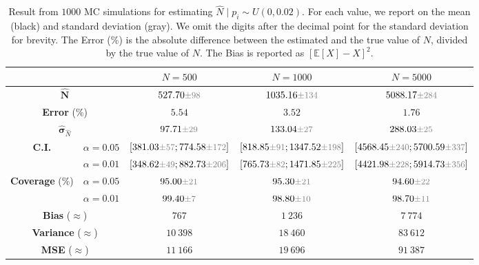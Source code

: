 \documentclass{article}
\newcommand{\variance}[1]{\ensuremath{\text{\small \textcolor{gray}{$\pm #1$}}}}
\begin{document}
\begin{table}[t]
    \centering 
    \caption*{$p_i \sim U(0, 0.02)$}
    \begin{tabular}{c c|c c c}
        \toprule
        & & \multicolumn{1}{|c|}{${N}=500$} & \multicolumn{1}{c|}{${N}=1000$} & \multicolumn{1}{c}{${N}=5000$} \\
        \midrule
        \multicolumn{2}{c|}{${\hat{\mathbf{N}}}$} & $527.70 \variance{98}$ & $1035.16 \variance{134}$ & $5088.17 \variance{284}$  \\
        \multicolumn{2}{c|}{\textbf{Error} (\%)} & $5.54$ & $3.52$ & $1.76$ \\
        \multicolumn{2}{c|}{${\hat{\mathbf{\sigma}}}_{\hat{N}}$} & $97.71 \variance{29}$ & $133.04 \variance{27}$ & $288.03 \variance{25}$\\
        \multirow{2}{*}{\textbf{C.I.}} & $\alpha = 0.05$ & $[381.03 \variance{57}; 774.58 \variance{172}]$ & $[818.85 \variance{91}; 1347.52 \variance{198}]$ & $[4568.45 \variance{240}; 5700.59 \variance{337}]$
        \\
        & $\alpha = 0.01$ & $[348.62 \variance{49}; 882.73 \variance{206}]$ & $[765.73 \variance{82}; 1471.85 \variance{225}]$ & $[4421.98 \variance{228}; 5914.73 \variance{356}]$ \\
        \midrule
        \multirow{2}{*}{\textbf{Coverage} (\%)} & $\alpha = 0.05$ & $95.00 \variance{21}$ & $95.30 \variance{21}$ & $94.60 \variance{22}$ \\
        & $\alpha = 0.01$ & $99.40 \variance{7}$ & $98.80 \variance{10}$ & $98.70 \variance{11}$ \\
        \multicolumn{2}{c|}{\textbf{Bias} ($\approx$)} & $767$ & $1\ 236$ & $7\ 774$ \\
        \multicolumn{2}{c|}{\textbf{Variance} ($\approx$)} & $10\ 398$ & $18\ 460$ & $83\ 612$ \\
        \multicolumn{2}{c|}{\textbf{MSE} ($\approx$)} & $11\ 166$ & $19\ 696$ & $91\ 387$ \\
        \bottomrule
    \end{tabular}
    \caption{Result from $1000$ MC simulations for estimating $\hat{N} \mid p_i \sim U(0, 0.02)$. For each value, we report on the mean (black) and standard deviation (gray). We omit the digits after the decimal point for the standard deviation for brevity.
    The Error (\%) is the absolute difference between the estimated and the true value of $N$, divided by the true value of $N$. The Bias is reported as ${\left[ \mathbb{E}[X] - X \right]}^2$.}
    \label{tab:problem_2_results_uniform_0_02}
\end{table}
\end{document}
